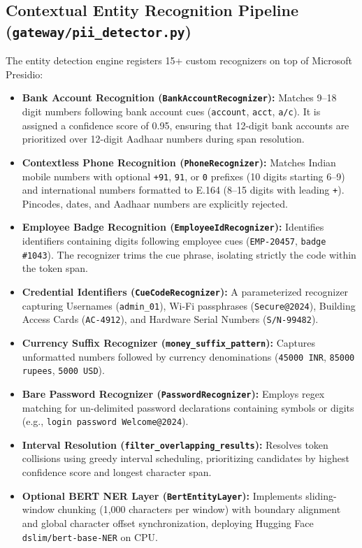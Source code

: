 \documentclass[12pt,a4paper,oneside]{report}
\numberwithin{equation}{chapter}
\begin{document}
\subsection{Contextual Entity Recognition Pipeline (\texttt{gateway/pii\_detector.py})}
The entity detection engine registers 15+ custom recognizers on top of Microsoft Presidio:
\begin{itemize}[leftmargin=*]
    \item \textbf{Bank Account Recognition (\texttt{BankAccountRecognizer}):} Matches 9--18 digit numbers following bank account cues (\texttt{account}, \texttt{acct}, \texttt{a/c}). It is assigned a confidence score of 0.95, ensuring that 12-digit bank accounts are prioritized over 12-digit Aadhaar numbers during span resolution.
    \item \textbf{Contextless Phone Recognition (\texttt{PhoneRecognizer}):} Matches Indian mobile numbers with optional \texttt{+91}, \texttt{91}, or \texttt{0} prefixes (10 digits starting 6--9) and international numbers formatted to E.164 (8--15 digits with leading \texttt{+}). Pincodes, dates, and Aadhaar numbers are explicitly rejected.
    \item \textbf{Employee Badge Recognition (\texttt{EmployeeIdRecognizer}):} Identifies identifiers containing digits following employee cues (\texttt{EMP-20457}, \texttt{badge \#1043}). The recognizer trims the cue phrase, isolating strictly the code within the token span.
    \item \textbf{Credential Identifiers (\texttt{CueCodeRecognizer}):} A parameterized recognizer capturing Usernames (\texttt{admin\_01}), Wi-Fi passphrases (\texttt{Secure@2024}), Building Access Cards (\texttt{AC-4912}), and Hardware Serial Numbers (\texttt{S/N-99482}).
    \item \textbf{Currency Suffix Recognizer (\texttt{money\_suffix\_pattern}):} Captures unformatted numbers followed by currency denominations (\texttt{45000 INR}, \texttt{85000 rupees}, \texttt{5000 USD}).
    \item \textbf{Bare Password Recognizer (\texttt{PasswordRecognizer}):} Employs regex matching for un-delimited password declarations containing symbols or digits (e.g., \texttt{login password Welcome@2024}).
    \item \textbf{Interval Resolution (\texttt{filter\_overlapping\_results}):} Resolves token collisions using greedy interval scheduling, prioritizing candidates by highest confidence score and longest character span.
    \item \textbf{Optional BERT NER Layer (\texttt{BertEntityLayer}):} Implements sliding-window chunking (1,000 characters per window) with boundary alignment and global character offset synchronization, deploying Hugging Face \texttt{dslim/bert-base-NER} on CPU.
\end{itemize}
\end{document}
